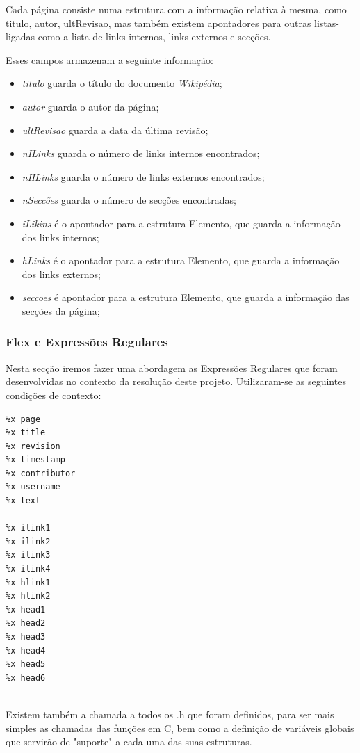 \documentclass[11pt, a4paper, oneside]{article}
\begin{document}
Cada página consiste numa estrutura com a informação relativa à mesma, como titulo, autor, ultRevisao, mas também existem apontadores para outras listas-ligadas como a lista de links internos, links externos e secções.


Esses campos armazenam a seguinte informação:
\begin{itemize}

\item \textit{titulo} guarda o título do documento \textit{Wikipédia};
\item \textit{autor} guarda o autor da página;
\item \textit{ultRevisao} guarda a data da última revisão;
\item \textit{nILinks} guarda o número de links internos encontrados;
\item \textit{nHLinks} guarda o número de links externos encontrados;
\item \textit{nSeccões} guarda o número de secções encontradas;
\item \textit{iLikins} é o apontador para a estrutura Elemento, que guarda a informação dos links internos;
\item \textit{hLinks} é o apontador para a estrutura Elemento, que guarda a informação dos links externos;
\item \textit{seccoes} é apontador para a estrutura Elemento, que guarda a informação das secções da página;



\newpage
\end{itemize}
\subsubsection{Flex e Expressões Regulares}

Nesta secção iremos fazer uma abordagem as Expressões Regulares que foram desenvolvidas no contexto da resolução deste projeto. Utilizaram-se as seguintes condições de contexto:

\begin{verbatim}
%x page
%x title
%x revision
%x timestamp
%x contributor
%x username
%x text

%x ilink1
%x ilink2
%x ilink3
%x ilink4
%x hlink1
%x hlink2
%x head1
%x head2
%x head3
%x head4
%x head5
%x head6


\end{verbatim}


Existem também a chamada a todos os .h que foram definidos, para ser mais simples as chamadas das funções em C, bem como a definição de variáveis globais que servirão de "suporte" a cada uma das suas estruturas.
\end{document}
